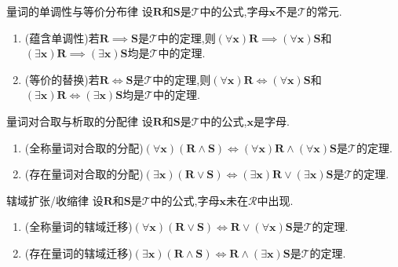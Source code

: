 \begin{metatheorem}{量词的单调性与等价分布律}{}
	设$\boldsymbol{R}$和$\boldsymbol{S}$是$\mathcal{T}$中的公式,字母$\boldsymbol{x}$不是$\mathcal{T}$的常元.
	\begin{enumerate}
		\item (蕴含单调性)若$\boldsymbol{R}\implies\boldsymbol{S}$是$\mathcal{T}$中的定理,则$\left(\forall\boldsymbol{x}\right)\boldsymbol{R}\implies\left(\forall\boldsymbol{x}\right)\boldsymbol{S}$和$\left(\exists\boldsymbol{x}\right)\boldsymbol{R}\implies\left(\exists\boldsymbol{x}\right)\boldsymbol{S}$均是$\mathcal{T}$中的定理.
		\item (等价的替换)若$\boldsymbol{R}\iff\boldsymbol{S}$是$\mathcal{T}$中的定理,则$\left(\forall\boldsymbol{x}\right)\boldsymbol{R}\iff\left(\forall\boldsymbol{x}\right)\boldsymbol{S}$和$\left(\exists\boldsymbol{x}\right)\boldsymbol{R}\iff\left(\exists\boldsymbol{x}\right)\boldsymbol{S}$均是$\mathcal{T}$中的定理.
	\end{enumerate}
\end{metatheorem}

\begin{metatheorem}{量词对合取与析取的分配律}{}
	设$\boldsymbol{R}$和$\boldsymbol{S}$是$\mathcal{T}$中的公式,$\boldsymbol{x}$是字母.
	\begin{enumerate}
		\item (全称量词对合取的分配)$\left(\forall\boldsymbol{x}\right)\left(\boldsymbol{R}\wedge\boldsymbol{S}\right)\iff\left(\forall\boldsymbol{x}\right)\boldsymbol{R}\wedge\left(\forall\boldsymbol{x}\right)\boldsymbol{S}$是$\mathcal{T}$的定理.
		\item (存在量词对合取的分配)$\left(\exists\boldsymbol{x}\right)\left(\boldsymbol{R}\vee\boldsymbol{S}\right)\iff\left(\exists\boldsymbol{x}\right)\boldsymbol{R}\vee\left(\exists\boldsymbol{x}\right)\boldsymbol{S}$是$\mathcal{T}$的定理.
	\end{enumerate}
\end{metatheorem}

\begin{metatheorem}{辖域扩张/收缩律}{}
	设$\boldsymbol{R}$和$\boldsymbol{S}$是$\mathcal{T}$中的公式,字母$\boldsymbol{x}$未在$\mathcal{R}$中出现.
	\begin{enumerate}
		\item (全称量词的辖域迁移)$\left(\forall\boldsymbol{x}\right)\left(\boldsymbol{R}\vee\boldsymbol{S}\right)\iff\boldsymbol{R}\vee\left(\forall\boldsymbol{x}\right)\boldsymbol{S}$是$\mathcal{T}$的定理.
		\item (存在量词的辖域迁移)$\left(\exists\boldsymbol{x}\right)\left(\boldsymbol{R}\wedge\boldsymbol{S}\right)\iff\boldsymbol{R}\wedge\left(\exists\boldsymbol{x}\right)\boldsymbol{S}$是$\mathcal{T}$的定理.
	\end{enumerate}
\end{metatheorem}

